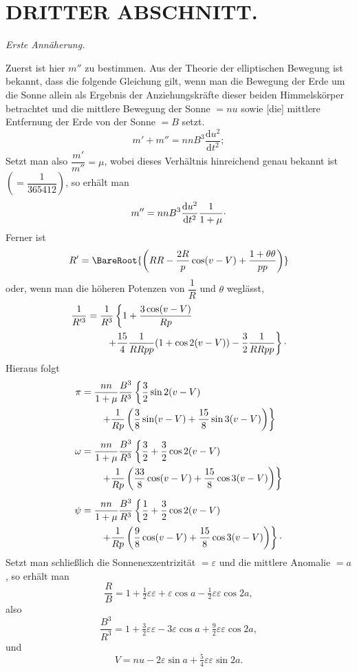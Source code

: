 \clearpage
\begingroup
{}
\renewcommand{\headrulewidth}{0pt}
\section*{DRITTER ABSCHNITT.}
\begin{center}
\itshape Erste Annäherung.
\end{center}

\par\noindent\hspace*{\parindent}Zuerst ist hier \(m''\) zu bestimmen.
Aus der Theorie der elliptischen Bewegung ist bekannt, dass die folgende Gleichung gilt, wenn man die
Bewegung der Erde um die Sonne allein als Ergebnis der Anziehungskräfte dieser
beiden Himmelskörper betrachtet und die mittlere Bewegung der Sonne \(=nu\) sowie
[die] mittlere Entfernung der Erde von der Sonne \(=B\) setzt.
\[
m'+m''=nnB^3\frac{\mathrm{d}u^2}{\mathrm{d}t^2};
\]
\noindent Setzt man also \(\dfrac{m'}{m''}=\mu\), wobei dieses Verhältnis hinreichend genau
bekannt ist \(\left(=\dfrac{1}{365412}\right)\), so erhält man
\[
m''=nnB^3\frac{\mathrm{d}u^2}{\mathrm{d}t^2}\frac{1}{1+\mu}
\mathpunct{\raisebox{.4ex}{.}}
\]
\noindent Ferner ist
\[
R'=\BareRoot{\left(RR-\frac{2R}{p}\cos(v-V)+\frac{1+\theta\theta}{pp}\right)}
\]
\noindent oder, wenn man die höheren Potenzen von \(\dfrac{1}{R}\) und \(\theta\) weglässt,
\[
\begin{aligned}
\frac{1}{R'^3}&=\frac{1}{R^3}\left\{1+\frac{3\cos(v-V)}{Rp}\right.\\
&\qquad\left.+\frac{15}{4}\frac{1}{RRpp}(1+\cos2(v-V))
-\frac32\frac{1}{RRpp}\right\}\mathpunct{\raisebox{.4ex}{.}}
\end{aligned}
\]
\noindent Hieraus folgt
\[
\begin{aligned}
\pi&=\frac{nn}{1+\mu}\frac{B^3}{R^3}\left\{\frac32\sin2(v-V)\right.\\
&\qquad\left.+\frac{1}{Rp}\left(\frac38\sin(v-V)+\frac{15}{8}\sin3(v-V)\right)\right\}\\[5pt]
\omega&=\frac{nn}{1+\mu}\frac{B^3}{R^3}\left\{\frac32+\frac32\cos2(v-V)\right.\\
&\qquad\left.+\frac{1}{Rp}\left(\frac{33}{8}\cos(v-V)+\frac{15}{8}\cos3(v-V)\right)\right\}\\[5pt]
\psi&=\frac{nn}{1+\mu}\frac{B^3}{R^3}\left\{\frac12+\frac32\cos2(v-V)\right.\\
&\qquad\left.+\frac{1}{Rp}\left(\frac98\cos(v-V)+\frac{15}{8}\cos3(v-V)\right)\right\}
\mathpunct{\raisebox{.4ex}{.}}
\end{aligned}
\]
\noindent Setzt man schließlich die Sonnenexzentrizität \(=\varepsilon\) und die mittlere
Anomalie \(=a\), so erhält man
\[
\frac{R}{B}=1+\tfrac12\varepsilon\varepsilon+\varepsilon\cos a
-\tfrac12\varepsilon\varepsilon\cos2a,
\]
\noindent also
\[
\frac{B^3}{R^3}=1+\tfrac32\varepsilon\varepsilon-3\varepsilon\cos a
+\tfrac92\varepsilon\varepsilon\cos2a,
\]
\noindent und
\[
V=nu-2\varepsilon\sin a+\tfrac54\varepsilon\varepsilon\sin2a.
\]

